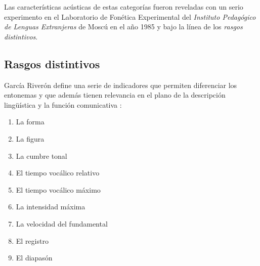 Las caracter\'isticas ac\'usticas de estas categor\'ias fueron reveladas con un serio experimento en el Laboratorio de Fon\'etica Experimental del \emph{Instituto Pedag\'ogico de Lenguas Extranjeras} de Mosc\'u en el a\~no 1985 \cite{garcia1996aspectos2} y bajo la l\'inea de los \emph{rasgos distintivos}.

\subsection{Rasgos distintivos}
Garc\'ia River\'on define una serie de indicadores que permiten diferenciar los entonemas y que adem\'as tienen 
relevancia en el plano de la descripci\'on ling\"u\'istica y la funci\'on comunicativa \cite[ac\'apite 2.1.1]{garcia1996aspectos2}:
\begin{enumerate}
\item La forma
\item La figura
\item La cumbre tonal
\item El tiempo voc\'alico relativo
\item El tiempo voc\'alico m\'aximo
\item La intensidad m\'axima
\item La velocidad del fundamental
\item El registro
\item El diapas\'on
\end{enumerate}


